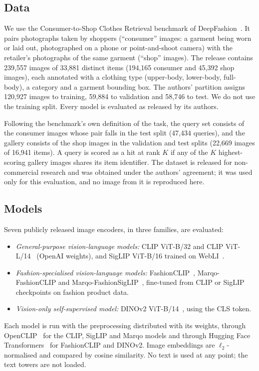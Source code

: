 \documentclass[10pt,twocolumn,letterpaper]{article}
\begin{document}
\subsection{Data}
We use the Consumer-to-Shop Clothes Retrieval benchmark of DeepFashion~\cite{liu2016deepfashion}. It pairs photographs taken by shoppers (``consumer'' images: a garment being worn or laid out, photographed on a phone or point-and-shoot camera) with the retailer's photographs of the same garment (``shop'' images). The release contains 239,557 images of 33,881 distinct items (194,165 consumer and 45,392 shop images), each annotated with a clothing type (upper-body, lower-body, full-body), a category and a garment bounding box. The authors' partition assigns 120,927 images to training, 59,884 to validation and 58,746 to test. We do not use the training split. Every model is evaluated as released by its authors.

Following the benchmark's own definition of the task, the query set consists of the consumer images whose pair falls in the test split (47,434 queries), and the gallery consists of the shop images in the validation and test splits (22,669 images of 16,941 items). A query is scored as a hit at rank $K$ if any of the $K$ highest-scoring gallery images shares its item identifier. The dataset is released for non-commercial research and was obtained under the authors' agreement; it was used only for this evaluation, and no image from it is reproduced here.

\subsection{Models}
Seven publicly released image encoders, in three families, are evaluated:
\begin{itemize}[leftmargin=*,itemsep=1pt,topsep=2pt]
  \item \emph{General-purpose vision-language models:} CLIP ViT-B/32 and CLIP ViT-L/14~\cite{radford2021clip} (OpenAI weights), and SigLIP ViT-B/16 trained on WebLI~\cite{zhai2023siglip}.
  \item \emph{Fashion-specialised vision-language models:} FashionCLIP~\cite{chia2022fashionclip}, Marqo-FashionCLIP and Marqo-FashionSigLIP~\cite{marqo2024fashion}, fine-tuned from CLIP or SigLIP checkpoints on fashion product data.
  \item \emph{Vision-only self-supervised model:} DINOv2 ViT-B/14~\cite{oquab2024dinov2}, using the CLS token.
\end{itemize}
Each model is run with the preprocessing distributed with its weights, through OpenCLIP~\cite{ilharco2021openclip} for the CLIP, SigLIP and Marqo models and through Hugging Face Transformers~\cite{wolf2020transformers} for FashionCLIP and DINOv2. Image embeddings are $\ell_2$-normalised and compared by cosine similarity. No text is used at any point; the text towers are not loaded.
\end{document}
